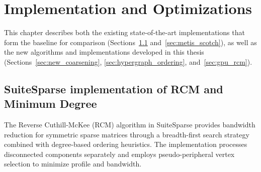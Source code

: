 \chapter{Implementation and Optimizations}
\label{ch:implementation_and_optimizations}

This chapter describes both the existing state-of-the-art implementations that form the baseline for comparison (Sections~\ref{sec:suitesparse} and~\ref{sec:metis_scotch}), as well as the new algorithms and implementations developed in this thesis (Sections~\ref{sec:new_coarsening}, \ref{sec:hypergraph_ordering}, and~\ref{sec:gpu_rcm}).

\section{SuiteSparse implementation of RCM and Minimum Degree}
\label{sec:suitesparse}

The Reverse Cuthill-McKee (RCM) algorithm in SuiteSparse provides bandwidth reduction for symmetric sparse matrices through a breadth-first search strategy combined with degree-based ordering heuristics. The implementation processes disconnected components separately and employs pseudo-peripheral vertex selection to minimize profile and bandwidth.


